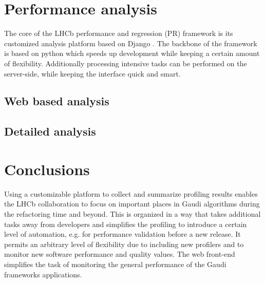\documentclass[a4paper]{jpconf}
\begin{document}
\section{Performance analysis}
\label{sec:performance_analysis}

The core of the LHCb performance and regression (PR) framework is its customized analysis platform based on Django \cite{django}. The backbone of the framework is based on python which speeds up development while keeping a certain amount of flexibility. Additionally processing intensive tasks can be performed on the server-side, while keeping the interface quick and smart.
\newline


\subsection{Web based analysis}
\label{sec:web_based_analysis}

\subsection{Detailed analysis}
\label{sec:detailed_analysis}

\section{Conclusions}
\label{sec:conclusions}

Using a customizable platform to collect and summarize profiling results enables the LHCb collaboration to focus on important places in Gaudi algorithms during the refactoring time and beyond. This is organized in a way that takes additional tasks away from developers and simplifies the profiling to introduce a certain level of automation, e.g. for performance validation before a new release. It permits an arbitrary level of flexibility due to including new profilers and to monitor new software performance and quality values. The web front-end simplifies the task of monitoring the general performance of the Gaudi frameworks applications. 
\end{document}
